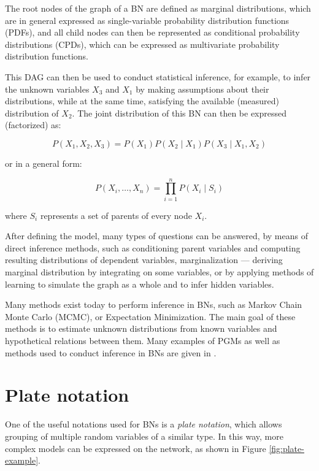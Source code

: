 The root nodes of the graph of a BN are defined as marginal distributions, which are in general expressed as single-variable probability distribution functions (PDFs), and all child nodes can then be represented as conditional probability distributions (CPDs), which can be expressed as multivariate probability distribution functions. 

This DAG can then be used to conduct statistical inference, for example, to infer the unknown variables $X_3$ and $X_1$ by making assumptions about their distributions, while at the same time, satisfying the available (measured) distribution of $X_2$. The joint distribution of this BN can then be expressed (factorized) as:

\begin{equation}
P{(X_1, X_2, X_3)} = P{(X_1)} P{(X_2 \mid X_1)} P{(X_3 \mid X_1, X_2)}
\end{equation}

or in a general form:

\begin{equation}
P{(X_i, \ldots, X_n)} = \prod_{i=1}^{n} P{(X_i \mid S_i)}
\end{equation}

where $S_i$ represents a set of parents of every node $X_i$.

After defining the model, many types of questions can be answered, by means of direct inference methods, such as conditioning parent variables and computing resulting distributions of dependent variables, marginalization --- deriving marginal distribution by integrating on some variables,  or by applying methods of learning to simulate the graph as a whole and to infer hidden variables.

Many methods exist today to perform inference in BNs, such as Markov Chain Monte Carlo (MCMC), or Expectation Minimization. The main goal of these methods is to estimate unknown distributions from known variables and hypothetical relations between them. Many examples of PGMs as well as methods used to conduct inference in BNs are given in \cite{koller2009probabilistic}. 

\section{Plate notation}

One of the useful notations used for BNs is a \textit{plate notation}, which allows grouping of multiple random variables of a similar type. In this way, more complex models can be expressed on the network, as shown in Figure \ref{fig:plate-example}.

